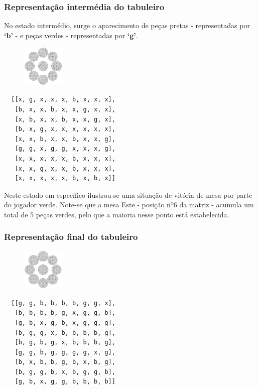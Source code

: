 \documentclass[a4paper]{article}
\begin{document}
\subsubsection{Representação intermédia do tabuleiro}
No estado intermédio, surge o aparecimento de peças pretas - representadas por \textbf{`b'} - e peças verdes - representadas por \textbf{`g'}.

\begin{figure}
\centering
\includegraphics[width=0.18\textwidth]{board-setup-2.png}
\end{figure}

\begin{lstlisting}
  [[x, g, x, x, x, b, x, x, x],
   [b, x, x, b, x, x, g, x, x],
   [x, b, x, x, b, x, x, g, x],
   [b, x, g, x, x, x, x, x, x],
   [x, x, b, x, x, b, x, x, g],
   [g, g, x, g, g, x, x, x, g],
   [x, x, x, x, x, b, x, x, x],
   [x, x, g, x, x, b, x, x, x],
   [x, x, x, x, x, b, x, b, x]]
\end{lstlisting}

Neste estado em específico ilustrou-se uma situação de vitória de mesa por parte do jogador verde. Note-se que a mesa Este - posição nº6 da matriz - acumula um total de 5 peças verdes, pelo que a maioria nesse ponto está estabelecida.

\subsubsection{Representação final do tabuleiro}

\begin{figure}
\centering
\includegraphics[width=0.18\textwidth]{board-setup-3.png}
\end{figure}


\begin{lstlisting}
  [[g, g, b, b, b, b, g, g, x],
   [b, b, b, b, g, x, g, g, b],
   [g, b, x, g, b, x, g, g, g],
   [b, g, g, x, b, b, b, b, g],
   [b, g, b, g, x, b, b, b, g],
   [g, g, b, g, g, g, g, x, g],
   [b, x, b, b, g, b, x, b, g],
   [b, g, g, b, x, b, g, g, b],
   [g, b, x, g, g, b, b, b, b]]
\end{lstlisting}
\end{document}
